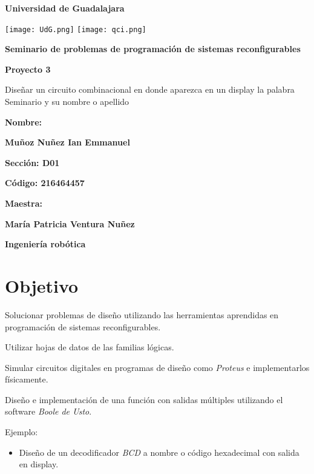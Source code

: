 \documentclass[12pt, oneside, openany]{article}
\begin{document}
\begin{titlepage}
    \centering
    {\bfseries\LARGE Universidad de Guadalajara \par}
    \vfill
    {
        \texttt{[image: UdG.png]}
        \texttt{[image: qci.png]}
        \par
    }
    \vfill
    {\bfseries\LARGE Seminario de problemas de programación de sistemas reconfigurables \par}
    \vfill
    {\bfseries\LARGE Proyecto 3 \par}
    \vfill
    {\LARGE Diseñar un circuito combinacional en donde aparezca en un display la palabra Seminario y su nombre o apellido \par}
    \vfill
    {\bfseries\LARGE Nombre: \par}
    \vfill
    {\bfseries\LARGE Muñoz Nuñez Ian Emmanuel \par}
    \vfill
    {\bfseries\LARGE Sección: D01 \par}
    \vfill
    {\bfseries\LARGE Código: 216464457 \par}
    \vfill
    {\bfseries\LARGE Maestra: \par}
    \vfill
    {\bfseries\LARGE María Patricia Ventura Nuñez \par}
    \vfill
    {\bfseries\LARGE Ingeniería robótica \par}
\end{titlepage}


\newpage
\section{Objetivo}
{\sffamily\large
    \hspace{0.5cm} Solucionar problemas de diseño utilizando las herramientas aprendidas en programación de sistemas reconfigurables.
    
    \hspace{0.5cm} Utilizar hojas de datos de las familias lógicas.
    
    \hspace{0.5cm} Simular circuitos digitales en programas de diseño como \emph{Proteus\texttrademark} e implementarlos físicamente.

    \hspace{0.5cm} Diseño e implementación de una función con salidas múltiples utilizando el software \emph{Boole de Usto}.
    
    \hspace{0.5cm} Ejemplo:
    \renewcommand{\labelitemi}{$\bullet$}
    \begin{itemize}
        \item Diseño de un decodificador \emph{BCD} a nombre o código hexadecimal con salida en display.
    \end{itemize}
}
\end{document}
